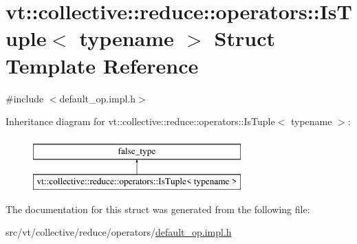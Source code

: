 \hypertarget{structvt_1_1collective_1_1reduce_1_1operators_1_1_is_tuple}{}\section{vt\+:\+:collective\+:\+:reduce\+:\+:operators\+:\+:Is\+Tuple$<$ typename $>$ Struct Template Reference}
\label{structvt_1_1collective_1_1reduce_1_1operators_1_1_is_tuple}


{\ttfamily \#include $<$default\+\_\+op.\+impl.\+h$>$}

Inheritance diagram for vt\+:\+:collective\+:\+:reduce\+:\+:operators\+:\+:Is\+Tuple$<$ typename $>$\+:\begin{figure}[H]
\begin{center}
\leavevmode
\includegraphics[height=2.000000cm]{structvt_1_1collective_1_1reduce_1_1operators_1_1_is_tuple}
\end{center}
\end{figure}


The documentation for this struct was generated from the following file\+:\begin{DoxyCompactItemize}
\item 
src/vt/collective/reduce/operators/\hyperlink{default__op_8impl_8h}{default\+\_\+op.\+impl.\+h}\end{DoxyCompactItemize}
